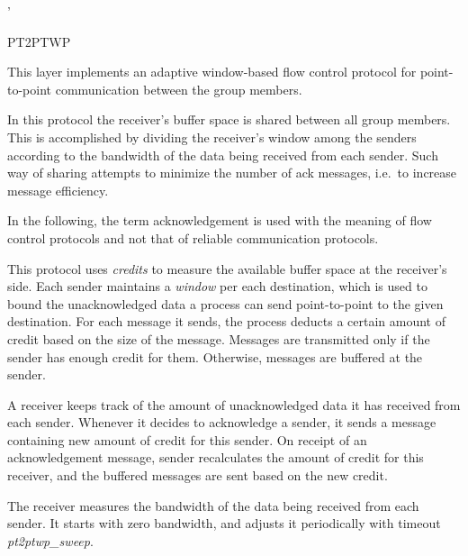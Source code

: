 %
%
%
'\begin{Layer}{PT2PTWP} 

This layer implements an adaptive window-based flow control protocol 
for point-to-point communication between the group members. 

In this protocol the receiver's buffer space is shared between all group
members. This is accomplished by dividing the receiver's window among 
the senders according to the bandwidth of the data being received from each 
sender. Such way of sharing attempts to minimize the number of ack messages, 
i.e.\ to increase message efficiency.

\begin{Protocol}
In the following, the term acknowledgement is used with the meaning 
of flow control protocols and not that of reliable communication protocols.

This protocol uses \emph{credits} to measure the available buffer space 
at the receiver's side. Each sender maintains a \emph{window} per each 
destination, which is used to bound the unacknowledged data a process 
can send point-to-point to the given destination. For each message it 
sends, the process deducts a certain amount of credit based on the size 
of the message. Messages are transmitted only if the sender has enough 
credit for them. Otherwise, messages are buffered at the sender.

A receiver keeps track of the amount of unacknowledged data it has 
received from each sender. Whenever it decides to acknowledge a sender,
it sends a message containing new amount of credit for this sender.
On receipt of an acknowledgement message, sender recalculates the amount 
of credit for this receiver, and the buffered messages are sent based 
on the new credit.

The receiver measures the bandwidth of the data being received from each 
sender. It starts with zero bandwidth, and adjusts it periodically with 
timeout \emph{pt2ptwp\_sweep}. 


\end{Protocol}
\end{Layer}
